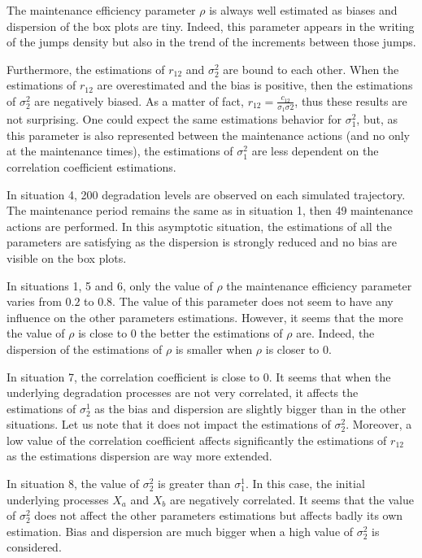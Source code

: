 \noindent The maintenance efficiency parameter $\rho$ is always well estimated as biases and dispersion of the box plots are tiny. Indeed, this parameter appears in the writing of the jumps density but also in the trend of the increments between those jumps. 

\noindent Furthermore, the estimations of $r_{12}$ and $\sigma_2^2$ are bound to each other. When the estimations of $r_{12}$ are overestimated and the bias is positive, then the estimations of $\sigma_2^2$ are negatively biased. As a matter of fact, $r_{12}=\frac{c_{12}}{\sigma_1\sigma2}$, thus these results are not surprising. One could expect the same estimations behavior for $\sigma_1^2$, but, as this parameter is also represented between the maintenance actions (and no only at the maintenance times), the estimations of $\sigma_1^2$ are less dependent on the correlation coefficient estimations.

\noindent In situation 4, 200 degradation levels are observed on each simulated trajectory. The maintenance period remains the same as in situation 1, then 49 maintenance actions are performed. In this asymptotic situation, the estimations of all the parameters are satisfying as the dispersion is strongly reduced and no bias are visible on the box plots.

\noindent In situations 1, 5 and 6, only the value of $\rho$ the maintenance efficiency parameter varies  from $0.2$ to $0.8$. The value of this parameter does not seem to have any influence on the other parameters estimations. However, it seems that the more the value of $\rho$ is close to $0$ the better the estimations of $\rho$ are. Indeed, the dispersion of the estimations of $\rho$ is smaller when $\rho$ is closer to $0$.


\noindent In situation 7, the correlation coefficient is close to $0$. It seems that when the underlying  degradation processes are  not very correlated, it affects the estimations of $\sigma_2^1$ as the bias and dispersion are slightly bigger than in the other situations. Let us note that it does not impact the estimations of $\sigma_2^2$. Moreover, a low value of the correlation coefficient affects significantly the estimations of $r_{12}$ as the estimations dispersion are way more extended.



\noindent In situation 8, the value of $\sigma_2^2$ is greater than $\sigma_1^1$. In this case, the initial underlying processes $X_a$ and $X_b$ are negatively correlated. It seems that the value of $\sigma_2^2$ does not affect the other parameters estimations but affects badly its own estimation. Bias and dispersion are much bigger when a high value of $\sigma_2^2$ is considered.



